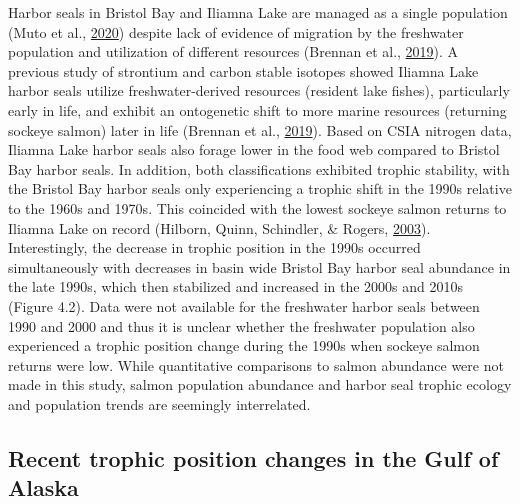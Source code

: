 \documentclass [11pt, proquest] {uwthesis}[2015/03/03]
\begin{document}
Harbor seals in Bristol Bay and Iliamna Lake are managed as a single
population (Muto et al., \protect\hyperlink{ref-Muto2020}{2020}) despite
lack of evidence of migration by the freshwater population and
utilization of different resources (Brennan et al.,
\protect\hyperlink{ref-Brennan2019}{2019}). A previous study of
strontium and carbon stable isotopes showed Iliamna Lake harbor seals
utilize freshwater-derived resources (resident lake fishes),
particularly early in life, and exhibit an ontogenetic shift to more
marine resources (returning sockeye salmon) later in life (Brennan et
al., \protect\hyperlink{ref-Brennan2019}{2019}). Based on CSIA nitrogen
data, Iliamna Lake harbor seals also forage lower in the food web
compared to Bristol Bay harbor seals. In addition, both classifications
exhibited trophic stability, with the Bristol Bay harbor seals only
experiencing a trophic shift in the 1990s relative to the 1960s and
1970s. This coincided with the lowest sockeye salmon returns to Iliamna
Lake on record (Hilborn, Quinn, Schindler, \& Rogers,
\protect\hyperlink{ref-Hilborn2003}{2003}). Interestingly, the decrease
in trophic position in the 1990s occurred simultaneously with decreases
in basin wide Bristol Bay harbor seal abundance in the late 1990s, which
then stabilized and increased in the 2000s and 2010s (Figure 4.2). Data
were not available for the freshwater harbor seals between 1990 and 2000
and thus it is unclear whether the freshwater population also
experienced a trophic position change during the 1990s when sockeye
salmon returns were low. While quantitative comparisons to salmon
abundance were not made in this study, salmon population abundance and
harbor seal trophic ecology and population trends are seemingly
interrelated.

\subsection{Recent trophic position changes in the Gulf of
Alaska}\label{recent-trophic-position-changes-in-the-gulf-of-alaska}
\end{document}

